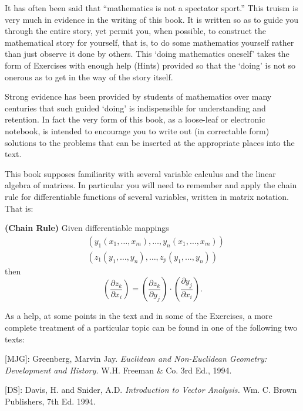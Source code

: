 \documentclass{ximera}
\begin{document}
It has often been said that ``mathematics is not a spectator sport.''
This truism is very much in evidence in the writing of this book. It
is written so as to guide you through the entire story, yet permit
you, when possible, to construct the mathematical story for yourself,
that is, to do some mathematics yourself rather than just observe it
done by others. This `doing mathematics oneself' takes the form of
Exercises with enough help (Hints) provided so that the `doing' is not
so onerous as to get in the way of the story itself.

Strong evidence has been provided by students of mathematics over many
centuries that such guided `doing' is indispensible for understanding and
retention. In fact the very form of this book, as a loose-leaf or electronic
notebook, is intended to encourage you to write out (in correctable form)
solutions to the problems that can be inserted at the appropriate places into
the text.

This book supposes familiarity with several variable calculus and the linear
algebra of matrices. In particular you will need to remember and apply the
chain rule for differentiable functions of several variables, written in
matrix notation. That is:

\begin{theorem}
\textbf{(Chain Rule)} Given differentiable mappings%
\begin{align*}
&  \left(  y_{1}\left(  x_{1},\ldots,x_{m}\right)  ,\ldots,y_{n}\left(
x_{1},\ldots,x_{m}\right)  \right) \\
&  \left(  z_{1}\left(  y_{1},\ldots,y_{n}\right)  ,\ldots,z_{p}\left(
y_{1},\ldots,y_{n}\right)  \right)
\end{align*}
then%
\[
\left(  \frac{\partial z_{k}}{\partial x_{i}}\right)  =\left(  \frac{\partial
z_{k}}{\partial y_{j}}\right)  \cdot\left(  \frac{\partial y_{j}}{\partial
x_{i}}\right)  .
\]

\end{theorem}

As a help, at some points in the text and in some of the Exercises, a more
complete treatment of a particular topic can be found in one of the following
two texts:

[MJG]: Greenberg, Marvin Jay. \textit{Euclidean and Non-Euclidean Geometry:
Development and History.} W.H. Freeman \& Co. 3rd Ed., 1994.

[DS]: Davis, H. and Snider, A.D. \textit{Introduction to Vector Analysis.} Wm.
C. Brown Publishers, 7th Ed. 1994.
\end{document}
